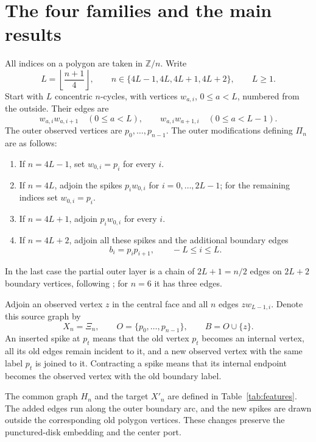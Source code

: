 \documentclass[11pt]{article}
\theoremstyle{definition}
\begin{document}
\section{The four families and the main results}
\label{sec:families}

All indices on a polygon are taken in \(\mathbb Z/n\).
Write
\[
 L=\left\lfloor\frac{n+1}{4}\right\rfloor,\qquad
 n\in\{4L-1,4L,4L+1,4L+2\},\qquad L\ge1.
\]
Start with \(L\) concentric \(n\)-cycles, with vertices
\(w_{a,i}\), \(0\le a<L\), numbered from the outside.
Their edges are
\[
 w_{a,i}w_{a,i+1}\quad(0\le a<L),\qquad
 w_{a,i}w_{a+1,i}\quad(0\le a<L-1).
\]
The outer observed vertices are \(p_0,\ldots,p_{n-1}\).
The outer modifications defining \(\Pi_n\) are as follows:
\begin{enumerate}
\item If \(n=4L-1\), set \(w_{0,i}=p_i\) for every \(i\).
\item If \(n=4L\), adjoin the spikes \(p_iw_{0,i}\) for
\(i=0,\ldots,2L-1\); for the remaining indices set \(w_{0,i}=p_i\).
\item If \(n=4L+1\), adjoin \(p_iw_{0,i}\) for every \(i\).
\item If \(n=4L+2\), adjoin all these spikes and the additional
boundary edges
\[
 b_i=p_ip_{i+1},\qquad -L\le i\le L .
\]
\end{enumerate}
In the last case the partial outer layer is a chain of \(2L+1=n/2\)
edges on \(2L+2\) boundary vertices, following
\cite[Figures 2 and 5]{ABCC}; for \(n=6\) it has three edges.

Adjoin an observed vertex \(z\) in the central face and all \(n\) edges
\(zw_{L-1,i}\). Denote this source graph by
\[
 X_n=\Xi_n,\qquad O=\{p_0,\ldots,p_{n-1}\},\qquad B=O\cup\{z\}.
\]
An inserted spike at \(p_t\) means that the old vertex \(p_t\)
becomes an internal vertex, all its old edges remain incident to it,
and a new observed vertex with the same label \(p_t\) is joined to it.
Contracting a spike means that its internal endpoint becomes the
observed vertex with the old boundary label.

The common graph \(H_n\) and the target \(X'_n\) are defined in
Table~\ref{tab:features}. The added edges run along the outer boundary
arc, and the new spikes are drawn outside the corresponding old
polygon vertices. These changes preserve the punctured-disk embedding and the center port.
\end{document}
